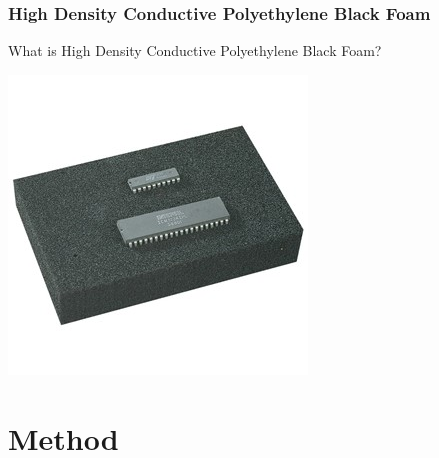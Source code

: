 \documentclass{beamer}
\begin{document}
\begin{frame}
    \frametitle{High Density Conductive
Polyethylene Black Foam}
    What is High Density Conductive Polyethylene Black Foam?
    \begin{center}
        \includegraphics[width=.5\textwidth]{img/foam.jpg}
    \end{center}
\end{frame}

\section{Method}%
\label{sec:Method}

\end{document}
